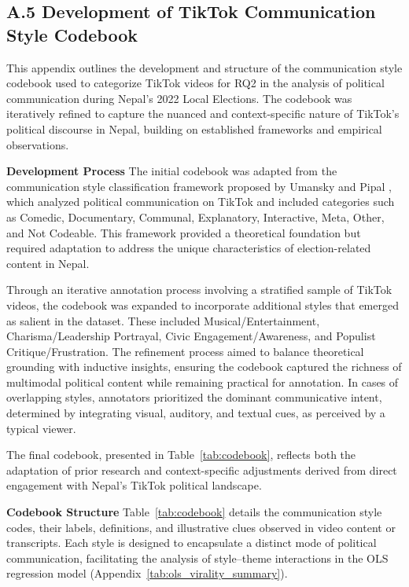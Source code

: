 \documentclass[12pt,a4paper]{report}
\begin{document}
\subsection*{A.5 Development of TikTok Communication Style Codebook}
\label{app:codebook}

This appendix outlines the development and structure of the communication style codebook used to categorize TikTok videos for RQ2 in the analysis of political communication during Nepal’s 2022 Local Elections. The codebook was iteratively refined to capture the nuanced and context-specific nature of TikTok’s political discourse in Nepal, building on established frameworks and empirical observations.

\textbf{Development Process}
The initial codebook was adapted from the communication style classification framework proposed by Umansky and Pipal \parencite{umansky2023dances}, which analyzed political communication on TikTok and included categories such as Comedic, Documentary, Communal, Explanatory, Interactive, Meta, Other, and Not Codeable. This framework provided a theoretical foundation but required adaptation to address the unique characteristics of election-related content in Nepal.

Through an iterative annotation process involving a stratified sample of TikTok videos, the codebook was expanded to incorporate additional styles that emerged as salient in the dataset. These included Musical/Entertainment, Charisma/Leadership Portrayal, Civic Engagement/Awareness, and Populist Critique/Frustration. The refinement process aimed to balance theoretical grounding with inductive insights, ensuring the codebook captured the richness of multimodal political content while remaining practical for annotation. In cases of overlapping styles, annotators prioritized the dominant communicative intent, determined by integrating visual, auditory, and textual cues, as perceived by a typical viewer.

The final codebook, presented in Table~\ref{tab:codebook}, reflects both the adaptation of prior research and context-specific adjustments derived from direct engagement with Nepal’s TikTok political landscape.

\textbf{Codebook Structure}
Table~\ref{tab:codebook} details the communication style codes, their labels, definitions, and illustrative clues observed in video content or transcripts. Each style is designed to encapsulate a distinct mode of political communication, facilitating the analysis of style--theme interactions in the OLS regression model (Appendix~\ref{tab:ols_virality_summary}).
\end{document}
